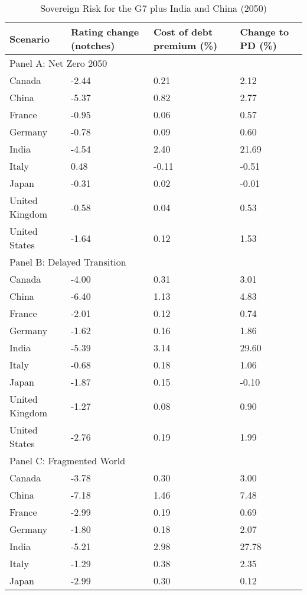 
\begin{table}[tb!]
\footnotesize
\center
\caption{Sovereign Risk for the G7 plus India and China (2050)}
\label{tab:SRBC}
\begin{tabularx}{\textwidth}{X X X X}
\hline
Scenario & Rating change (notches) & Cost of debt premium (\%) & Change to PD (\%)\\
\hline
\multicolumn{4}{p{\textwidth}}{Panel A: Net Zero 2050}\\
\hline
Canada &  -2.44  &  0.21  &  2.12 \\
China &  -5.37  &  0.82  &  2.77 \\
France &  -0.95  &  0.06  &  0.57 \\
Germany &  -0.78  &  0.09  &  0.60 \\
India &  -4.54  &  2.40  &  21.69 \\
Italy &  0.48  &  -0.11  &  -0.51 \\
Japan &  -0.31  &  0.02  &  -0.01 \\
United Kingdom &  -0.58  &  0.04  &  0.53 \\
United States &  -1.64  &  0.12  &  1.53 \\
\hline
\multicolumn{4}{p{\textwidth}}{Panel B: Delayed Transition}\\
\hline
Canada &  -4.00  &  0.31  &  3.01 \\
China &  -6.40  &  1.13  &  4.83 \\
France &  -2.01  &  0.12  &  0.74 \\
Germany &  -1.62  &  0.16  &  1.86 \\
India &  -5.39  &  3.14  &  29.60 \\
Italy &  -0.68  &  0.18  &  1.06 \\
Japan &  -1.87  &  0.15  &  -0.10 \\
United Kingdom &  -1.27  &  0.08  &  0.90 \\
United States &  -2.76  &  0.19  &  1.99 \\
\hline
\multicolumn{4}{p{\textwidth}}{Panel C: Fragmented World}\\
\hline
Canada &  -3.78  &  0.30  &  3.00 \\
China &  -7.18  &  1.46  &  7.48 \\
France &  -2.99  &  0.19  &  0.69 \\
Germany &  -1.80  &  0.18  &  2.07 \\
India &  -5.21  &  2.98  &  27.78 \\
Italy &  -1.29  &  0.38  &  2.35 \\
Japan &  -2.99  &  0.30  &  0.12 \\

\end{tabularx}
\end{table}
